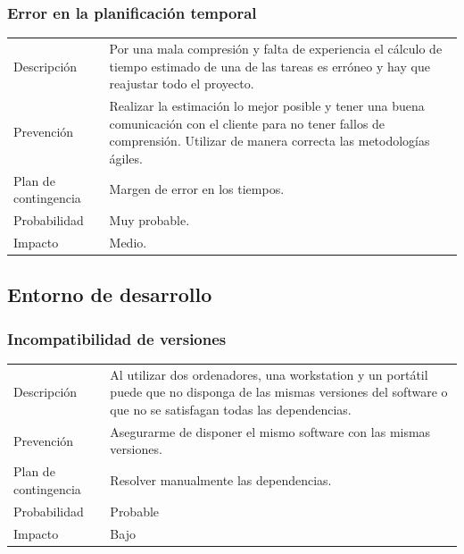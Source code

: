 \subsubsection{Error en la planificaci\'{o}n temporal}
\begin{table}[H]
    \begin{center}
        \begin{tabular}{l p{8cm}}
            Descripci\'{o}n                 & Por una mala compresi\'on y falta de experiencia el 
            c\'alculo
            de tiempo estimado de una de las tareas es err\'oneo y hay que reajustar todo el 
            proyecto. \\
            Prevenci\'{o}n                  & Realizar la estimación lo mejor posible y tener una 
            buena
            								  comunicaci\'on con el cliente para no tener fallos 
            								  de comprensión. Utilizar de manera 
            								  correcta las metodolog\'ias \'agiles. \\ 
            Plan de contingencia            & Margen de error en los tiempos. \\
            Probabilidad                    & Muy probable. \\
            Impacto                         & Medio. \\
        \end{tabular}
    \end{center}
    
\end{table}
\subsection{Entorno de desarrollo}
\subsubsection{Incompatibilidad de versiones}
\begin{table}[H]
    \begin{center}
        \begin{tabular}{l p{8cm}}
            Descripci\'{o}n                 & Al utilizar dos ordenadores, una workstation y un port\'{a}til puede que no 
            								  disponga de las mismas versiones del software o que no se satisfagan todas las 
            								  dependencias. \\
            Prevenci\'{o}n                  & Asegurarme de disponer el mismo software con las mismas versiones. \\ 
            Plan de contingencia            & Resolver manualmente las dependencias. \\
            Probabilidad                    & Probable \\
            Impacto                         & Bajo\\
        \end{tabular}
    \end{center}
    
\end{table}
